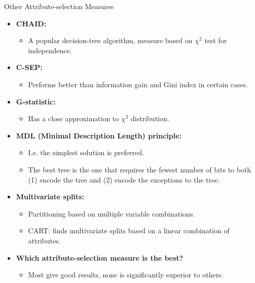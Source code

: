 \begin{frame}{Other Attribute-selection Measures}
	\begin{itemize}
		\item \textbf{CHAID:}
		      \begin{itemize}
			      \item A popular decision-tree algorithm, measure based on $\chi^2$ test for independence.
		      \end{itemize}
		\item \textbf{C-SEP:}
		      \begin{itemize}
			      \item Performs better than information gain and Gini index in certain cases.
		      \end{itemize}
		\item \textbf{G-statistic:}
		      \begin{itemize}
			      \item Has a close approximation to $\chi^2$ distribution.
		      \end{itemize}
		\item \textbf{MDL (Minimal Description Length) principle:}
		      \begin{itemize}
			      \item I.e. the simplest solution is preferred.
			      \item The best tree is the one that requires the fewest number of bits to both (1) encode the tree and (2) encode the exceptions to the tree.
		      \end{itemize}
		\item \textbf{Multivariate splits:}
		      \begin{itemize}
			      \item Partitioning based on multiple variable combinations.
			      \item CART: finds multivariate splits based on a linear combination of attributes.
		      \end{itemize}
		\item \textbf{Which attribute-selection measure is the best?}
		      \begin{itemize}
			      \item Most give good results, none is significantly superior to others.
		      \end{itemize}
	\end{itemize}
\end{frame}

